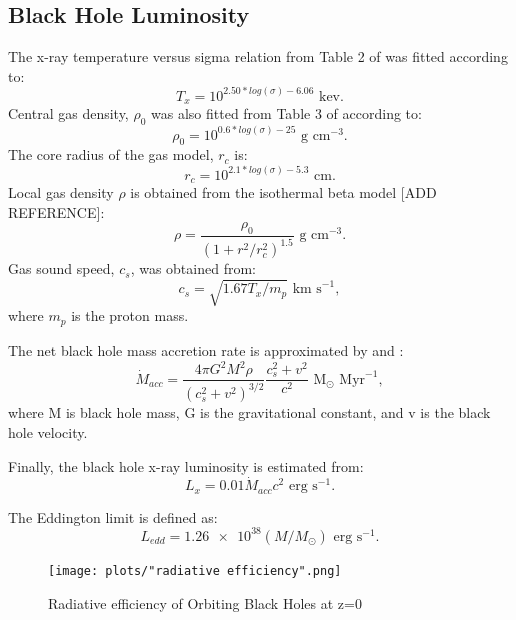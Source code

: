 \documentclass[english, apj]{emulateapj}
\begin{document}
\subsection{Black Hole Luminosity}
The x-ray temperature versus sigma relation from Table 2 of  \citet{2018ApJ...857...32B} was fitted according to:
\begin{equation}
    T_x = 10^{2.50*log(\sigma) - 6.06} \text{  kev}.
\end{equation}
Central gas density, ${\rho}_0$ was also fitted from Table 3 of \citet{2018ApJ...857...32B} according to:
\begin{equation}
    \rho_0 = 10^{0.6*log(\sigma) - 25} \text{  g cm}^{-3}.
\end{equation}
The core radius of the gas model, ${r_c}$ is:
\begin{equation}
    r_c = 10^{2.1*log(\sigma) - 5.3} \text{  cm}.
\end{equation}
Local gas density ${\rho}$ is obtained from the isothermal beta model [ADD REFERENCE]:
\begin{equation} \label{beta_model}
    \rho = \frac{\rho_0}{(1+r^2/r_c^2)^{1.5}} \text{  g cm}^{-3}.
\end{equation}
Gas sound speed, $c_s$, was obtained from:
\begin{equation}
    c_s = \sqrt{1.67T_x/m_p} \text{  km s}^{-1},
\end{equation}
where $m_p$ is the proton mass.

The net black hole mass accretion rate is approximated by \citet{2018MNRAS.476.1412I} and \citet{2019arXiv190202349I}:
\begin{equation}
    \dot{M}_{acc} = \frac{4{\pi}G^2M^2\rho}{(c_s^2+v^2)^{3/2}} \frac{c_s^2+v^2}{c^2} \text{  M}_\odot \text{ Myr}^{-1},
\end{equation}
where M is black hole mass, G is the gravitational constant, and v is the black hole velocity.

Finally, the black hole x-ray luminosity is estimated from:
\begin{equation}
    L_x = 0.01\dot{M}_{acc}c^2 \text{  erg s}^{-1}.
\end{equation}

The Eddington limit is defined as:
\begin{equation}
    L_{edd} = \num{1.26e38} (M/M_{\odot}) \text{  erg s}^{-1}.
\end{equation}

\begin{figure}[htp]
\begin{center}
\texttt{[image: plots/"radiative efficiency".png]}
\caption{Radiative efficiency of Orbiting Black Holes at z=0}
\label{fig:rad_eff}
\end{center}
\end{figure}
\end{document}
